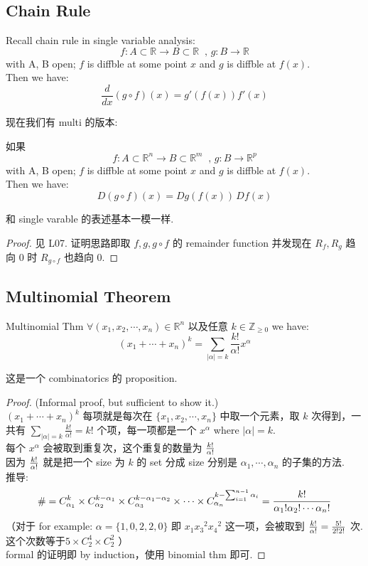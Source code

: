 \subsection{Chain Rule}
\noindent Recall chain rule in single variable analysis:
$$f: A \subset \mathbb{R} \rightarrow B \subset \mathbb{R} \;\; \text{, } g: B \rightarrow \mathbb{R} 
$$
with A, B open; $f$ is diffble at some point $x$ and $g$ is diffble at $f(x)$.\\
Then we have: 
$$
\frac{d}{dx} (g \circ f) (x) = g'(f(x)) f'(x)
$$

现在我们有 multi 的版本:
\begin{theorem}
    如果 $$f: A \subset \mathbb{R}^n \rightarrow B \subset \mathbb{R}^m \;\; \text{, } g: B \rightarrow \mathbb{R}^p 
$$
with A, B open; $f$ is diffble at some point $x$ and $g$ is diffble at $f(x)$.\\
Then we have:
$$
D (g \circ f) (x) =Dg(f(x))\, Df(x)
$$
\end{theorem}
和 single varable 的表述基本一模一样.
\begin{proof}
    见 L07. 证明思路即取 $f,g, g\circ f$ 的 remainder function 并发现在 $R_f, R_g$ 趋向 0 时 $R_{g\circ f}$ 也趋向 0.
\end{proof}

\subsection{Multinomial Theorem}
\begin{theorem}{Multinomial Thm} \label{Multinomial Thm}
$\forall (x_1, x_2, \cdots, x_n) \in \mathbb{R}^n$ 以及任意 $k \in \mathbb{Z}_{\geq 0}$ we have:
$$
{(x_1 + \cdots + x_n)}^k  = \sum_{|\alpha| = k} \frac{k!}{\alpha !} x^\alpha 
$$
\end{theorem}
这是一个 combinatorics 的 proposition. 
\begin{proof}
    (Informal proof, but sufficient to show it.)\\
    ${(x_1 + \cdots + x_n)}^k$ 每项就是每次在 $\{x_1, x_2, \cdots, x_n\}$ 中取一个元素，取 $k$ 次得到，一共有 $\sum_{|\alpha| = k} \frac{k!}{\alpha !} = k!$ 个项，每一项都是一个 $x^\alpha$ where  $|\alpha| = k$.\\
    每个 $x^\alpha$ 会被取到重复次，这个重复的数量为 ${k! \over \alpha !}$\\
     因为 $k! \over \alpha !$ 就是把一个 size 为 $k$ 的 set 分成 size 分别是 $\alpha_1, \cdots, \alpha_n$ 的子集的方法.\\
     推导: 
$$
\# =  C^k_{\alpha_1} \times  C^{k-\alpha_1}_{\alpha_2}  \times C^{k-\alpha_1 - \alpha_2}_{\alpha_3} \times\cdots \times C^{k - \sum_{i=1}^{n-1} \alpha _i}_{\alpha_n} = {k! \over \alpha_1! \alpha_2 ! \cdots \alpha_n !}
$$
    （对于 for example:  $\alpha = \{1,0,2,2,0\}$ 即 $x_1 {x_3}^2 {x_4}^2$ 这一项，会被取到 ${k! \over \alpha !} = \frac{5!}{2!2!}$ 次. 这个次数等于$ 5 \times C^4_2 \times C^2_2 $ ）
    \\ formal 的证明即 by induction，使用 binomial thm 即可.
\end{proof}

